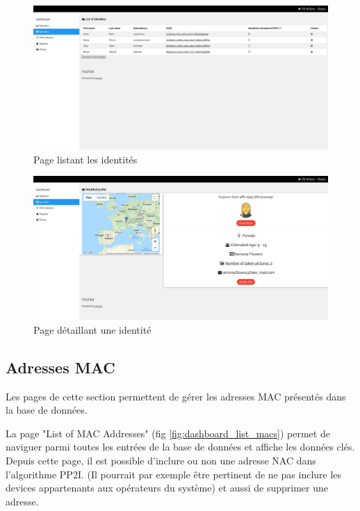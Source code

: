 \clearpage
\newpage
\thispagestyle{empty}
\begin{landscape}
    \centering
\thispagestyle{empty}
\begin{figure}[H]
	\includegraphics[width=0.95\linewidth]{images/dashboard/identities.png}
	\caption{Page listant les identités}
	\label{fig:dashboard_list_identities}
\end{figure}
\end{landscape}

\clearpage
\newpage
\thispagestyle{empty}
\begin{landscape}
    \centering
\thispagestyle{empty}
\begin{figure}[H]
	\includegraphics[width=0.95\linewidth]{images/dashboard/detailled_identities.png}
	\caption{Page détaillant une identité}
	\label{fig:dashboard_identity}
\end{figure}
\end{landscape}

\subsection{Adresses MAC}
Les pages de cette section permettent de gérer les adresses MAC présentés dans la base de données.

La page "List of MAC Addresses" (fig \ref{fig:dashboard_list_macs}) permet de naviguer parmi toutes les entrées de la base de données et affiche les données clés.
Depuis cette page, il est possible d'inclure ou non une adresse NAC dans l'algorithme PP2I. (Il pourrait par exemple être pertinent de ne pas inclure les devices appartenants aux opérateurs du système)
et aussi de supprimer une adresse.


